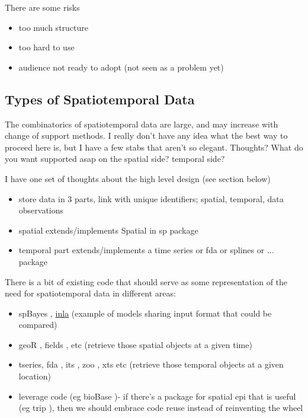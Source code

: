 \documentclass[12pt]{article}
\begin{document}
There are some risks
\begin{itemize}
\item too much structure
\item too hard to use
\item audience not ready to adopt (not seen as a problem yet)
\end{itemize}

\subsection*{Types of Spatiotemporal Data}
The combinatorics of spatiotemporal data are large, and may increase with
change of support methods.  I really don't have any idea what the best
way to proceed here is, but I have a few stabs that aren't so
elegant.  Thoughts?  What do you want supported asap on the spatial
side?  temporal side?

I have one set of thoughts about the high level design (see section below)
\begin{itemize}
\item store data in 3 parts, link with unique identifiers; spatial, temporal, data observations
\item spatial extends/implements Spatial in sp package
  \citep{pebesma05}
\item temporal part extends/implements a time series or fda or splines
  or $\ldots$ package
\end{itemize}

There is a bit of existing code that should serve as some
representation of the need for spatiotemporal data in different areas:
\begin{itemize}
\item spBayes \citep{finley09},
  \href{http://www.math.ntnu.no/~hrue/inla/}{inla} (example of models
  sharing input format that could be compared)
\item geoR \citep{ribeiro01}, fields \citep{furrer09}, etc (retrieve those spatial objects at a given time)
\item tseries, fda \citep{ramsay09}, its \citep{its09}, zoo
  \citep{zeileis05}, xts \citep{ryan09} etc (retrieve those temporal objects at a given location)
\item leverage code (eg bioBase \citep{gentleman04})- if there's a package for spatial epi
that is useful (eg trip \citep{sumner09}), then we should embrace code reuse instead of
reinventing the wheel 
\end{itemize}
\end{document}
